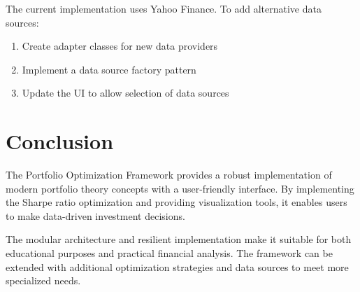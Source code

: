 \documentclass[11pt,a4paper]{article}
\begin{document}
The current implementation uses Yahoo Finance. To add alternative data sources:

\begin{enumerate}
    \item Create adapter classes for new data providers
    \item Implement a data source factory pattern
    \item Update the UI to allow selection of data sources
\end{enumerate}

\section{Conclusion}

The Portfolio Optimization Framework provides a robust implementation of modern portfolio theory concepts with a user-friendly interface. By implementing the Sharpe ratio optimization and providing visualization tools, it enables users to make data-driven investment decisions.

The modular architecture and resilient implementation make it suitable for both educational purposes and practical financial analysis. The framework can be extended with additional optimization strategies and data sources to meet more specialized needs.
\end{document}
